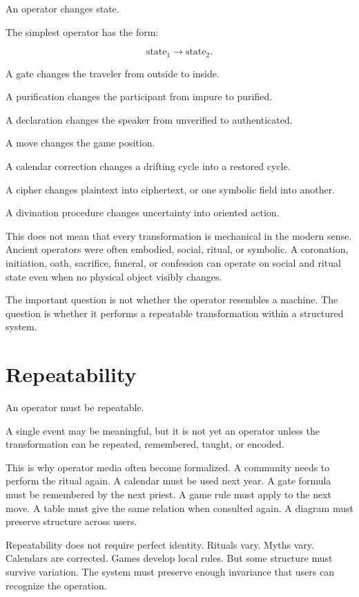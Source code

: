 \documentclass[11pt]{book}
\begin{document}
An operator changes state.

The simplest operator has the form:

\[
\text{state}_{1} \longrightarrow \text{state}_{2}.
\]

A gate changes the traveler from outside to inside.

A purification changes the participant from impure to purified.

A declaration changes the speaker from unverified to authenticated.

A move changes the game position.

A calendar correction changes a drifting cycle into a restored cycle.

A cipher changes plaintext into ciphertext, or one symbolic field into another.

A divination procedure changes uncertainty into oriented action.

This does not mean that every transformation is mechanical in the modern sense. Ancient operators were often embodied, social, ritual, or symbolic. A coronation, initiation, oath, sacrifice, funeral, or confession can operate on social and ritual state even when no physical object visibly changes.

The important question is not whether the operator resembles a machine. The question is whether it performs a repeatable transformation within a structured system.

\section{Repeatability}

An operator must be repeatable.

A single event may be meaningful, but it is not yet an operator unless the transformation can be repeated, remembered, taught, or encoded.

This is why operator media often become formalized. A community needs to perform the ritual again. A calendar must be used next year. A gate formula must be remembered by the next priest. A game rule must apply to the next move. A table must give the same relation when consulted again. A diagram must preserve structure across users.

Repeatability does not require perfect identity. Rituals vary. Myths vary. Calendars are corrected. Games develop local rules. But some structure must survive variation. The system must preserve enough invariance that users can recognize the operation.
\end{document}
